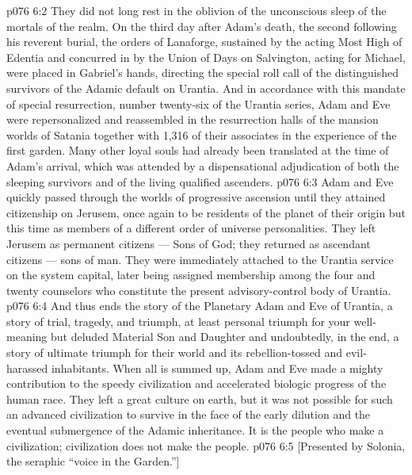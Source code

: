 \vs p076 6:2 They did not long rest in the oblivion of the unconscious sleep of the mortals of the realm. On the third day after Adam’s death, the second following his reverent burial, the orders of Lanaforge, sustained by the acting Most High of Edentia and concurred in by the Union of Days on Salvington, acting for Michael, were placed in Gabriel’s hands, directing the special roll call of the distinguished survivors of the Adamic default on Urantia. And in accordance with this mandate of special resurrection, number twenty\hyp{}six of the Urantia series, Adam and Eve were repersonalized and reassembled in the resurrection halls of the mansion worlds of Satania together with 1,316 of their associates in the experience of the first garden. Many other loyal souls had already been translated at the time of Adam’s arrival, which was attended by a dispensational adjudication of both the sleeping survivors and of the living qualified ascenders.
\vs p076 6:3 \pc Adam and Eve quickly passed through the worlds of progressive ascension until they attained citizenship on Jerusem, once again to be residents of the planet of their origin but this time as members of a different order of universe personalities. They left Jerusem as permanent citizens --- Sons of God; they returned as ascendant citizens --- sons of man. They were immediately attached to the Urantia service on the system capital, later being assigned membership among the four and twenty counselors who constitute the present advisory\hyp{}control body of Urantia.
\vs p076 6:4 \pc And thus ends the story of the Planetary Adam and Eve of Urantia, a story of trial, tragedy, and triumph, at least personal triumph for your well\hyp{}meaning but deluded Material Son and Daughter and undoubtedly, in the end, a story of ultimate triumph for their world and its rebellion\hyp{}tossed and evil\hyp{}harassed inhabitants. When all is summed up, Adam and Eve made a mighty contribution to the speedy civilization and accelerated biologic progress of the human race. They left a great culture on earth, but it was not possible for such an advanced civilization to survive in the face of the early dilution and the eventual submergence of the Adamic inheritance. It is the people who make a civilization; civilization does not make the people.
\vsetoff
\vs p076 6:5 [Presented by Solonia, the seraphic “voice in the Garden.”]
